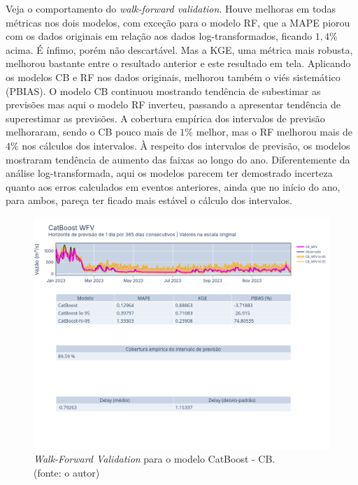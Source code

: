 Veja o comportamento do \textit{walk-forward validation}. Houve melhoras em todas métricas nos dois modelos, com exceção para o modelo RF, que a MAPE piorou com os dados originais em relação aos dados log-transformados, ficando $1,4\%$ acima. É ínfimo, porém não descartável. Mas a KGE, uma métrica mais robusta, melhorou bastante entre o resultado anterior e este resultado em tela. Aplicando os modelos CB e RF nos dados originais, melhorou também o viés sistemático (PBIAS). O modelo CB continuou mostrando tendência de subestimar as previsões mas aqui o modelo RF inverteu, passando a apresentar tendência de superestimar as previsões. A cobertura empírica dos intervalos de previsão melhoraram, sendo o CB pouco mais de $1\%$ melhor, mas o RF melhorou mais de $4\%$ nos cálculos dos intervalos. À respeito dos intervalos de previsão, os modelos mostraram tendência de aumento das faixas ao longo do ano. Diferentemente da análise log-transformada, aqui os modelos parecem ter demostrado incerteza quanto aos erros calculados em eventos anteriores, ainda que no início do ano, para ambos, pareça ter ficado mais estável o cálculo dos intervalos.

\begin{figure}[!h]
\centering
\includegraphics[scale=0.33]{Figuras/jequiti/resultados/CB_WFV_ORIG.png}
\caption{\textit{Walk-Forward Validation} para o modelo CatBoost - CB.\\(fonte: o autor)}
\label{fig:jequiti_CB_WFV_ORIG}
\end{figure}

